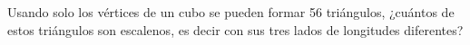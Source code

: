 Usando solo los vértices de un cubo se pueden formar 56 triángulos, ¿cuántos de estos triángulos son escalenos, es decir con sus tres lados de longitudes diferentes?